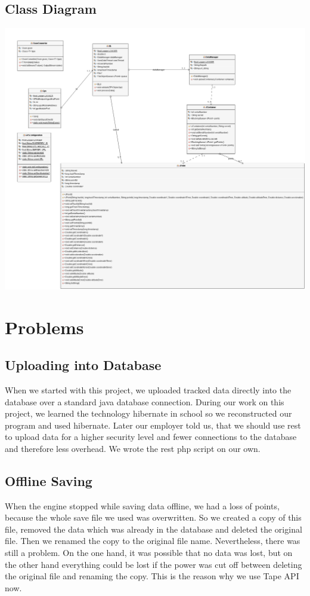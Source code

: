 \subsection{Class Diagram}
\begin{center}
\includegraphics[width=1\textwidth]{bilder/GPS_REST_UML_Diagram}
\end{center}
\section{Problems}
\subsection{Uploading into Database}
When we started with this project, we uploaded tracked data directly into the database over a standard java database connection. During our work on this project, we learned the technology hibernate in school so we reconstructed our program and used hibernate. Later our employer told us, that we should use \gls{rest} to upload data for a higher security level and fewer connections to the database and therefore less overhead. We wrote the \gls{rest} \gls{php} script on our own. 
\subsection{Offline Saving}
When the engine stopped while saving data offline, we had a loss of points, because the whole save file we used was overwritten. So we created a copy of this file, removed the data which was already in the database and deleted the original file. Then we renamed the copy to the original file name. Nevertheless, there was still a problem. On the one hand, it was possible that no data was lost, but on the other hand everything could be lost if the power was cut off between deleting the original file and renaming the copy. This is the reason why we use Tape API now. 

